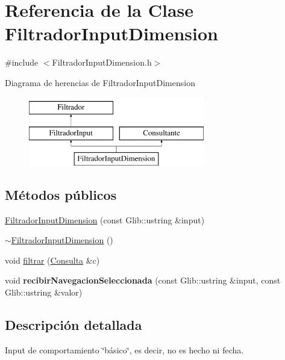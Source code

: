 \hypertarget{classFiltradorInputDimension}{\section{\-Referencia de la \-Clase \-Filtrador\-Input\-Dimension}
\label{classFiltradorInputDimension}
}


{\ttfamily \#include $<$\-Filtrador\-Input\-Dimension.\-h$>$}

\-Diagrama de herencias de \-Filtrador\-Input\-Dimension\begin{figure}[H]
\begin{center}
\leavevmode
\includegraphics[height=3.000000cm]{classFiltradorInputDimension}
\end{center}
\end{figure}
\subsection*{\-Métodos públicos}
\begin{DoxyCompactItemize}
\item 
\hyperlink{classFiltradorInputDimension_a4ca75aee43080e33ccb421297d4ff10e}{\-Filtrador\-Input\-Dimension} (const \-Glib\-::ustring \&input)
\item 
\hyperlink{classFiltradorInputDimension_ad2dbe4b65f21da8fd23264122d70f250}{$\sim$\-Filtrador\-Input\-Dimension} ()
\item 
void \hyperlink{classFiltradorInputDimension_a18da290896d3d045a31127f613d12a1c}{filtrar} (\hyperlink{classConsulta}{\-Consulta} \&c)
\item 
\hypertarget{classFiltradorInputDimension_aca8bed224cce07cfe437c32b4f2bb584}{void {\bfseries recibir\-Navegacion\-Seleccionada} (const \-Glib\-::ustring \&input, const \-Glib\-::ustring \&valor)}\label{classFiltradorInputDimension_aca8bed224cce07cfe437c32b4f2bb584}

\end{DoxyCompactItemize}


\subsection{\-Descripción detallada}
\-Input de comportamiento \char`\"{}básico\char`\"{}, es decir, no es hecho ni fecha. 


